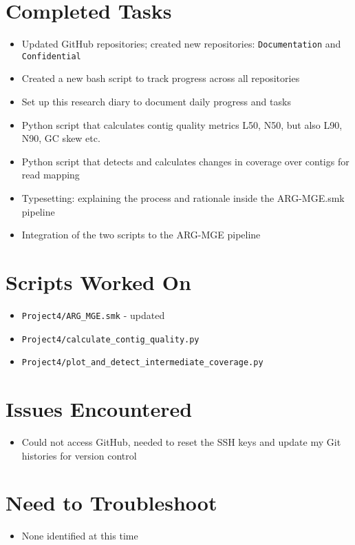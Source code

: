 \documentclass[11pt]{article}
\newcommand{\done}{\checkmark}  %
\begin{document}
	\section{Completed Tasks}
	\begin{itemize}
		\item [\done] Updated GitHub repositories; created new repositories: \texttt{Documentation} and \texttt{Confidential}
		\item [\done] Created a new bash script to track progress across all repositories
		\item [\done] Set up this research diary to document daily progress and tasks
		\item [\done] Python script that calculates contig quality metrics L50, N50, but also L90, N90, GC skew etc.
		\item [\done] Python script that detects and calculates changes in coverage over contigs for read mapping
		\item [\done] Typesetting: explaining the process and rationale inside the ARG-MGE.smk pipeline
		\item [\done] Integration of the two scripts to the ARG-MGE pipeline
		
	\end{itemize}
	
	\section{Scripts Worked On}
	\begin{itemize}
		\item \texttt{Project4/ARG\_MGE.smk} - updated
		\item [\done] \texttt  {Project4/calculate\_contig\_quality.py} 
		\item [\done] \texttt  {Project4/plot\_and\_detect\_intermediate\_coverage.py} 
	\end{itemize}
	
	
	\section{Issues Encountered}
	\begin{itemize}
		\item [\done] Could not access GitHub, needed to reset the SSH keys and update my Git histories for version control
	\end{itemize}
	
	\section{Need to Troubleshoot}
	\begin{itemize}
		\item None identified at this time
	\end{itemize}
\end{document}
